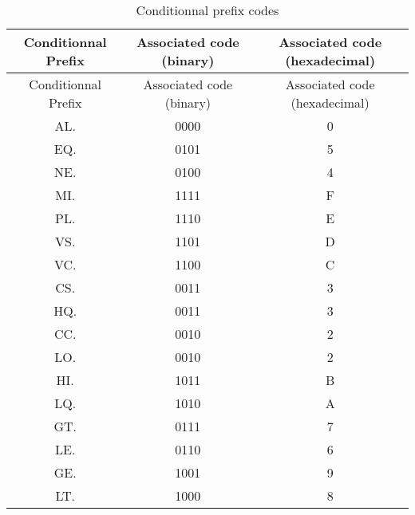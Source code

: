 \documentclass{article}
\begin{document}
\newpage
\begin{longtable}{|c|c|c|}
    \caption{Conditionnal prefix codes} \\
    \hline
    Conditionnal Prefix & Associated code (binary) & Associated code (hexadecimal) \\
    \hline
    \endfirsthead
    \hline
    Conditionnal Prefix & Associated code (binary) & Associated code (hexadecimal) \\
    \hline
    \endhead
    \hline
    \endfoot
    \hline
    \endlastfoot
    AL. & 0000 & 0 \\
    EQ. & 0101 & 5 \\
    NE. & 0100 & 4 \\
    MI. & 1111 & F \\
    PL. & 1110 & E \\
    VS. & 1101 & D \\
    VC. & 1100 & C \\
    CS. & 0011 & 3 \\
    HQ. & 0011 & 3 \\
    CC. & 0010 & 2 \\
    LO. & 0010 & 2 \\
    HI. & 1011 & B \\
    LQ. & 1010 & A \\
    GT. & 0111 & 7 \\
    LE. & 0110 & 6 \\
    GE. & 1001 & 9 \\
    LT. & 1000 & 8 \\

\end{longtable}
\end{document}

